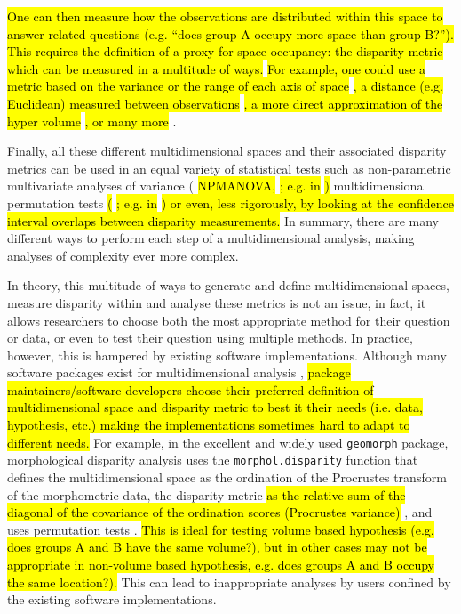 \documentclass[12pt,letterpaper]{article}
\begin{document}
\hl{One can then measure how the observations are distributed within this space to answer related questions (e.g. ``does group A occupy more space than group B?'').
This requires the definition of a proxy for space occupancy: the disparity metric}
\citep[or index;][]{Hopkins2017}
\hl{which can be measured in a multitude of ways.}
\hl{For example, one could use a metric based on the variance or the range of each axis of space}
\citep{Wills2001, Ciampaglio2001}
\hl{, a distance (e.g. Euclidean) measured between observations}
\citep{foote1993contributions,Foote29111996}
\hl{, a more direct approximation of the hyper volume }
\citep{cornwell2006trait,DonohueDim}
\hl{, or many more }
\citep[e.g.][]{navarro2003MDA}.

Finally, all these different multidimensional spaces and their associated disparity metrics can be used in an equal variety of statistical tests such as non-parametric multivariate analyses of variance (
\hl{NPMANOVA, }
\citealt{NPMANOVA}
\hl{; e.g. in }
\citealt{Brusatte12092008}
\hl{)}
multidimensional permutation tests
\hl{(}
\citealt{ManlyPermutations}
\hl{; e.g. in }
\citealt{diaz2016global}
\hl{) or even, less rigorously, by looking at the confidence interval overlaps between disparity measurements.}
In summary, there are many different ways to perform each step of a multidimensional analysis, making analyses of complexity ever more complex.

In theory, this multitude of ways to generate and define multidimensional spaces, measure disparity within and analyse these metrics is not an issue, in fact, it allows researchers to choose both the most appropriate method for their question or data, or even to test their question using multiple methods.
In practice, however, this is hampered by existing software implementations.
Although many software packages exist for multidimensional analysis \citep[e.g.][]{navarro2003MDA,bouxin2005ginkgo,de2007ginkgo,oksanen2007vegan,geiger2008,adams2013geomorph,Claddis,adams2017geometric},
\hl{package maintainers/software developers choose their preferred definition of multidimensional space and disparity metric to best it their needs (i.e. data, hypothesis, etc.) making the implementations sometimes hard to adapt to different needs.}
For example, in the excellent and widely used \texttt{geomorph} package, morphological disparity analysis uses the \texttt{morphol.disparity} function that defines the multidimensional space as the ordination of the Procrustes transform of the morphometric data, the disparity metric
\hl{as the relative sum of the diagonal of the covariance of the ordination scores (Procrustes variance)}
, and uses permutation tests \citep{zelditch2012geometric,adams2013geomorph,adams2017geometric}.
\hl{This is ideal for testing volume based hypothesis (e.g. does groups A and B have the same volume?), but in other cases may not be appropriate in non-volume based hypothesis, e.g. does groups A and B occupy the same location?).}
This can lead to inappropriate analyses by users confined by the existing software implementations. %
\end{document}
